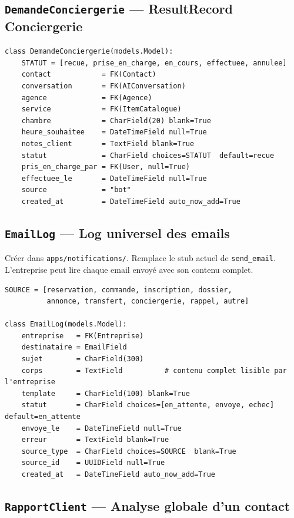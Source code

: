 \documentclass[11pt,a4paper]{article}
\newcommand{\slug}[1]{\texttt{\color{AGTDark}#1}}
\begin{document}
\subsection{\slug{DemandeConciergerie} — ResultRecord Conciergerie}

\begin{lstlisting}
class DemandeConciergerie(models.Model):
    STATUT = [recue, prise_en_charge, en_cours, effectuee, annulee]
    contact            = FK(Contact)
    conversation       = FK(AIConversation)
    agence             = FK(Agence)
    service            = FK(ItemCatalogue)
    chambre            = CharField(20) blank=True
    heure_souhaitee    = DateTimeField null=True
    notes_client       = TextField blank=True
    statut             = CharField choices=STATUT  default=recue
    pris_en_charge_par = FK(User, null=True)
    effectuee_le       = DateTimeField null=True
    source             = "bot"
    created_at         = DateTimeField auto_now_add=True
\end{lstlisting}

\subsection{\slug{EmailLog} — Log universel des emails}

Créer dans \slug{apps/notifications/}. Remplace le stub actuel de \slug{send\_email}.
L'entreprise peut lire chaque email envoyé avec son contenu complet.

\begin{lstlisting}
SOURCE = [reservation, commande, inscription, dossier,
          annonce, transfert, conciergerie, rappel, autre]

class EmailLog(models.Model):
    entreprise   = FK(Entreprise)
    destinataire = EmailField
    sujet        = CharField(300)
    corps        = TextField          # contenu complet lisible par l'entreprise
    template     = CharField(100) blank=True
    statut       = CharField choices=[en_attente, envoye, echec]  default=en_attente
    envoye_le    = DateTimeField null=True
    erreur       = TextField blank=True
    source_type  = CharField choices=SOURCE  blank=True
    source_id    = UUIDField null=True
    created_at   = DateTimeField auto_now_add=True
\end{lstlisting}

\subsection{\slug{RapportClient} — Analyse globale d'un contact}
\end{document}
